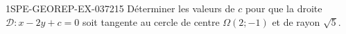 \begin{exercice}{1SPE-GEOREP-EX-037}{2}{15}
Déterminer les valeurs de $c$ pour que la droite $\mathcal{D} : x - 2y + c = 0$ soit tangente au cercle de centre $\Omega(2 ; -1)$ et de rayon $\sqrt{5}$.
\end{exercice}
